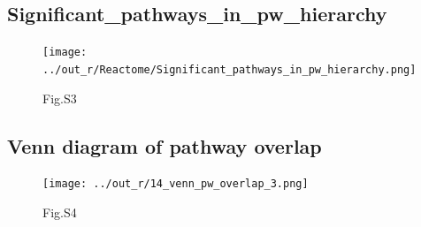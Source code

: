 \documentclass[
]{article}
\begin{document}
\hypertarget{significant_pathways_in_pw_hierarchy}{%
\subsection{Significant\_pathways\_in\_pw\_hierarchy}\label{significant_pathways_in_pw_hierarchy}}

\begin{figure}
\centering
\texttt{[image: ../out\_r/Reactome/Significant\_pathways\_in\_pw\_hierarchy.png]}
\caption{Fig.S3}
\end{figure}

\hypertarget{venn-diagram-of-pathway-overlap}{%
\subsection{Venn diagram of pathway
overlap}\label{venn-diagram-of-pathway-overlap}}

\begin{figure}
\centering
\texttt{[image: ../out\_r/14\_venn\_pw\_overlap\_3.png]}
\caption{Fig.S4}
\end{figure}
\end{document}
